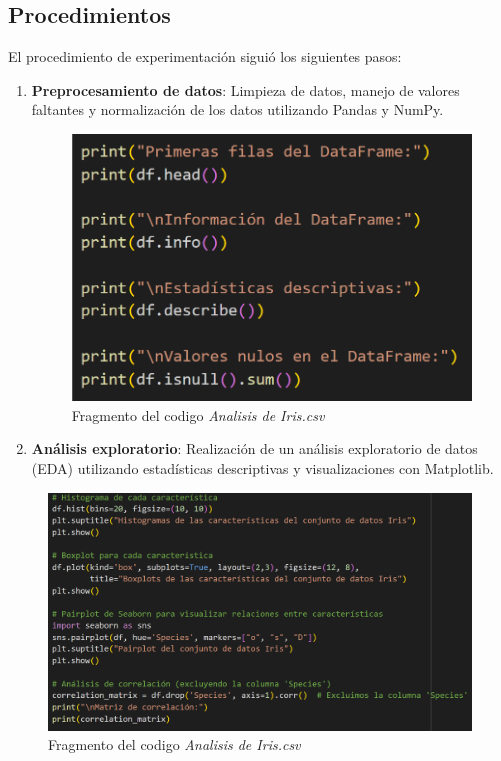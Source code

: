\documentclass[conference]{IEEEtran}
\begin{document}
    \subsection{Procedimientos}
        El procedimiento de experimentación siguió los siguientes pasos:
        \begin{enumerate}
        \item \textbf{Preprocesamiento de datos}: Limpieza de datos, manejo de valores faltantes y normalización de los datos utilizando Pandas y NumPy.
        
        \begin{figure}[h]
            \centering
            \includegraphics[scale=.4]{code1.png}
            \caption{Fragmento del codigo \textit{Analisis de Iris.csv}} 
        \end{figure}
    
        \item \textbf{Análisis exploratorio}: Realización de un análisis exploratorio de datos (EDA) utilizando estadísticas descriptivas y visualizaciones con Matplotlib.
        \end{enumerate}

        \begin{figure}[h]
            \centering
            \includegraphics[scale=.26]{code2.png}
            \caption{Fragmento del codigo \textit{Analisis de Iris.csv}} 
        \end{figure}
\end{document}
